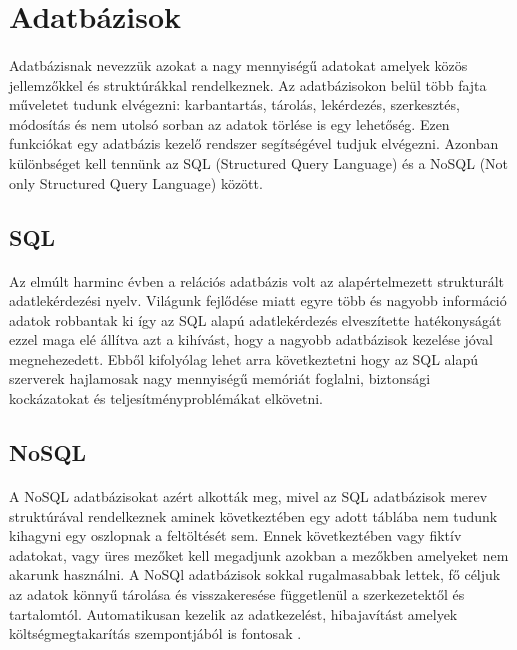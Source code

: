 \section{Adatbázisok}
\paragraph{}
Adatbázisnak nevezzük azokat a nagy mennyiségű adatokat amelyek közös jellemzőkkel és struktúrákkal rendelkeznek. Az adatbázisokon belül több fajta műveletet tudunk elvégezni: karbantartás, tárolás, lekérdezés, szerkesztés, módosítás és nem utolsó sorban az adatok törlése is egy lehetőség. Ezen funkciókat egy adatbázis kezelő rendszer segítségével tudjuk elvégezni.\cite{dbms} Azonban különbséget kell tennünk az SQL (Structured Query Language) és a NoSQL (Not only Structured Query Language) között.
\subsection{SQL}
\paragraph{}
Az elmúlt harminc évben a relációs adatbázis volt az alapértelmezett strukturált adatlekérdezési nyelv. Világunk fejlődése miatt egyre több és nagyobb információ adatok robbantak ki így az SQL alapú adatlekérdezés elveszítette hatékonyságát ezzel maga elé állítva azt a kihívást, hogy a nagyobb adatbázisok kezelése jóval megnehezedett. Ebből kifolyólag lehet arra következtetni hogy az SQL alapú szerverek hajlamosak nagy mennyiségű memóriát foglalni, biztonsági kockázatokat és teljesítményproblémákat elkövetni.\cite{venkatraman2016sql} 
	
\subsection{NoSQL}
\paragraph{}
A NoSQL adatbázisokat azért alkották meg, mivel az SQL adatbázisok merev struktúrával rendelkeznek aminek következtében egy adott táblába nem tudunk kihagyni egy oszlopnak a feltöltését sem. Ennek következtében vagy fiktív adatokat, vagy üres mezőket kell megadjunk azokban a mezőkben amelyeket nem akarunk használni. A NoSQl adatbázisok sokkal rugalmasabbak lettek, fő céljuk az adatok könnyű tárolása és visszakeresése függetlenül a szerkezetektől és tartalomtól. Automatikusan kezelik az adatkezelést, hibajavítást amelyek költségmegtakarítás szempontjából is fontosak \cite{venkatraman2016sql}.
	
